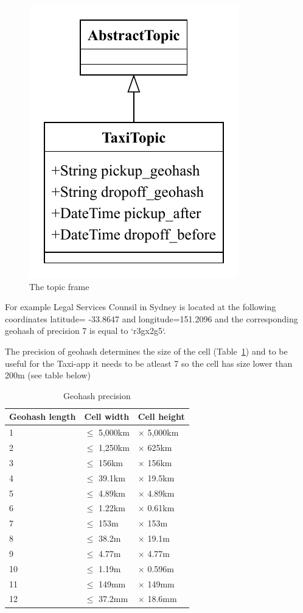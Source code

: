 \documentclass{article}
\begin{document}
\begin{figure}
	\centering
	\includegraphics[scale=0.7]{Topic.pdf}
	\caption{The topic frame}
	\label{fig:fr:topic}
\end{figure}


For example Legal Services Counsil in Sydney is located at the following coordinates latitude= -33.8647 and longitude=151.2096 and the corresponding geohash of precision 7 is equal to `r3gx2g5`.

The precision of geohash determines the size of the cell (Table~\ref{tab:geoprec}) and to be useful for the Taxi-app it needs to be atleast 7 so the cell has size lower than 200m (see table below)

\begin{table}
	\centering
	\begin{tabular}{lll}
		\toprule
		Geohash length & Cell width & Cell height \\
		\midrule
		1  & $\le$ 5,000km & $\times$ 5,000km \\
		2  & $\le$ 1,250km & $\times$ 625km   \\
		3  & $\le$ 156km   & $\times$ 156km   \\
		4  & $\le$ 39.1km  & $\times$ 19.5km  \\
		5  & $\le$ 4.89km  & $\times$ 4.89km  \\
		6  & $\le$ 1.22km  & $\times$ 0.61km  \\
		7  & $\le$ 153m    & $\times$ 153m    \\
		8  & $\le$ 38.2m   & $\times$ 19.1m   \\
		9  & $\le$ 4.77m   & $\times$ 4.77m   \\
		10 & $\le$ 1.19m   & $\times$ 0.596m  \\
		11 & $\le$ 149mm   & $\times$ 149mm   \\
		12 & $\le$ 37.2mm  & $\times$ 18.6mm  \\
		\bottomrule
	\end{tabular}
	\caption{Geohash precision}
	\label{tab:geoprec}
\end{table}
\end{document}
